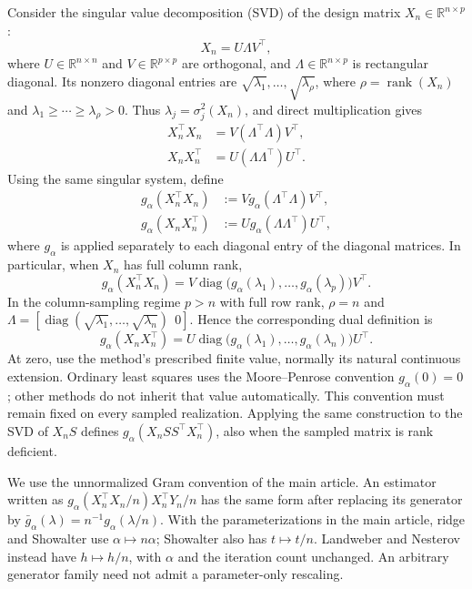 \documentclass[11pt,a4paper,leqno]{article}
\numberwithin{equation}{section}
\numberwithin{figure}{section}
\numberwithin{table}{section}
\theoremstyle{plain}
\theoremstyle{definition}
\theoremstyle{remark}
\newcommand{\RR}{\mathbb{R}}
\begin{document}
Consider the singular value decomposition (SVD) of the design matrix
$X_n\in\RR^{n\times p}$:
\begin{equation*}
    X_n=U\Lambda V^\top,
\end{equation*}
where $U\in\RR^{n\times n}$ and $V\in\RR^{p\times p}$ are orthogonal,
and $\Lambda\in\RR^{n\times p}$ is rectangular diagonal. Its nonzero
diagonal entries are $\sqrt{\lambda_1},\ldots,\sqrt{\lambda_\rho}$,
where $\rho=\operatorname{rank}(X_n)$ and
$\lambda_1\ge\cdots\ge\lambda_\rho>0$. Thus
$\lambda_j=\sigma_j^2(X_n)$, and direct multiplication gives
\[
    \begin{aligned}
    X_n^\top X_n&=V(\Lambda^\top\Lambda)V^\top,\\
    X_nX_n^\top&=U(\Lambda\Lambda^\top)U^\top.
    \end{aligned}
\]
Using the same singular system, define
\begin{equation*}
\begin{aligned}
    g_\alpha(X_n^\top X_n)
        &:=Vg_\alpha(\Lambda^\top\Lambda)V^\top,\\
    g_\alpha(X_nX_n^\top)
        &:=Ug_\alpha(\Lambda\Lambda^\top)U^\top,
\end{aligned}
\end{equation*}
where $g_\alpha$ is applied separately to each diagonal entry of the
diagonal matrices. In particular, when $X_n$ has full column rank,
\[
    g_\alpha(X_n^\top X_n)
    =V\operatorname{diag}\bigl(g_\alpha(\lambda_1),\ldots,
                              g_\alpha(\lambda_p)\bigr)V^\top.
\]
In the column-sampling regime $p>n$ with full row rank, $\rho=n$ and
$\Lambda=[\operatorname{diag}(\sqrt{\lambda_1},\ldots,
\sqrt{\lambda_n})\ \ 0]$. Hence the corresponding dual definition is
\[
    g_\alpha(X_nX_n^\top)
    =U\operatorname{diag}\bigl(g_\alpha(\lambda_1),\ldots,
                              g_\alpha(\lambda_n)\bigr)U^\top.
\]
At zero, use the method's prescribed finite value, normally its natural
continuous extension. Ordinary least squares uses the Moore--Penrose
convention $g_\alpha(0)=0$; other methods do not inherit that value automatically.
This convention must remain fixed on every sampled realization. Applying the
same construction to the SVD of $X_nS$ defines
$g_\alpha(X_nSS^\top X_n^\top)$, also when the sampled matrix is
rank deficient.

We use the unnormalized Gram convention of the main article. An estimator
written as $g_\alpha(X_n^\top X_n/n)X_n^\top Y_n/n$ has the same form after
replacing its generator by $\bar g_\alpha(\lambda)=n^{-1}g_\alpha(\lambda/n)$.
With the parameterizations in the main article, ridge and Showalter use
$\alpha\mapsto n\alpha$; Showalter also has $t\mapsto t/n$.
Landweber and Nesterov instead have $h\mapsto h/n$, with $\alpha$ and the
iteration count unchanged. An arbitrary generator family need not admit
a parameter-only rescaling.
\end{document}
